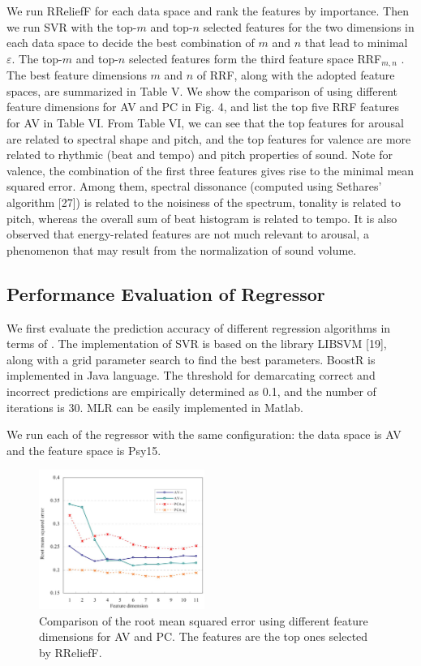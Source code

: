 \documentclass[journal, twoside]{IEEEtran}
\begin{document}
We run RReliefF for each data space and rank the features
by importance. Then we run SVR with the top-$m$ and top-$n$ selected features for the two dimensions in each data space to
decide the best combination of $m$ and $n$ that lead to minimal $\varepsilon$. The top-$m$ and top-$n$ selected features form the third feature space RRF$_{m,n}$ . The best feature dimensions $m$ and $n$ of
RRF, along with the adopted feature spaces, are summarized in
Table V. We show the comparison of using different feature dimensions for AV and PC in Fig. 4, and list the top five RRF features for AV in Table VI. From Table VI, we can see that the top
features for arousal are related to spectral shape and pitch, and
the top features for valence are more related to rhythmic (beat
and tempo) and pitch properties of sound. Note for valence, the
combination of the first three features gives rise to the minimal
mean squared error. Among them, spectral dissonance (computed using Sethares’ algorithm [27]) is related to the noisiness
of the spectrum, tonality is related to pitch, whereas the overall
sum of beat histogram is related to tempo. It is also observed
that energy-related features are not much relevant to arousal, a
phenomenon that may result from the normalization of sound
volume.

\subsection{Performance Evaluation of Regressor}
We first evaluate the prediction accuracy of different regression algorithms in terms of . The implementation of SVR is based on the library LIBSVM [19], along with a grid parameter search to find the best parameters. BoostR is implemented in Java language. The threshold for demarcating correct and incorrect predictions are empirically determined as 0.1, and the
number of iterations is 30. MLR can be easily implemented in
Matlab.

We run each of the regressor with the same configuration:
the data space is AV and the feature space is Psy15.

\begin{figure}[h]
\centering
\captionsetup{justification=centering}
\includegraphics[width=0.48\textwidth, height=0.40\textwidth]{fig4.png}
\caption{Comparison of the root mean squared error using different feature dimensions for AV and PC. The features are the top ones selected by RReliefF.}
\label{fig3}
\end{figure}
\vspace{.5cm}
\end{document}
